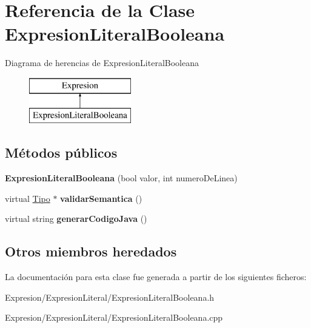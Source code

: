 \hypertarget{class_expresion_literal_booleana}{\section{Referencia de la Clase Expresion\-Literal\-Booleana}
\label{class_expresion_literal_booleana}
}
Diagrama de herencias de Expresion\-Literal\-Booleana\begin{figure}[H]
\begin{center}
\leavevmode
\includegraphics[height=2.000000cm]{class_expresion_literal_booleana}
\end{center}
\end{figure}
\subsection*{Métodos públicos}
\begin{DoxyCompactItemize}
\item 
\hypertarget{class_expresion_literal_booleana_a897dfa8b6bf7bb31875047843eb2d9ff}{{\bfseries Expresion\-Literal\-Booleana} (bool valor, int numero\-De\-Linea)}\label{class_expresion_literal_booleana_a897dfa8b6bf7bb31875047843eb2d9ff}

\item 
\hypertarget{class_expresion_literal_booleana_a83b1438c05f149292bad559b31843755}{virtual \hyperlink{class_tipo}{Tipo} $\ast$ {\bfseries validar\-Semantica} ()}\label{class_expresion_literal_booleana_a83b1438c05f149292bad559b31843755}

\item 
\hypertarget{class_expresion_literal_booleana_a3c4e9a857e89bd40ee1b94c0620ae668}{virtual string {\bfseries generar\-Codigo\-Java} ()}\label{class_expresion_literal_booleana_a3c4e9a857e89bd40ee1b94c0620ae668}

\end{DoxyCompactItemize}
\subsection*{Otros miembros heredados}


La documentación para esta clase fue generada a partir de los siguientes ficheros\-:\begin{DoxyCompactItemize}
\item 
Expresion/\-Expresion\-Literal/Expresion\-Literal\-Booleana.\-h\item 
Expresion/\-Expresion\-Literal/Expresion\-Literal\-Booleana.\-cpp\end{DoxyCompactItemize}

